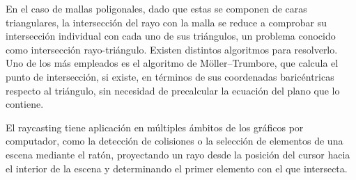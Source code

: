 En el caso de mallas poligonales, dado que estas se componen de caras triangulares, la intersección del rayo con la malla se reduce a comprobar su intersección individual con cada uno de sus triángulos, un problema conocido como intersección rayo-triángulo. Existen distintos algoritmos para resolverlo. Uno de los más empleados es el algoritmo de Möller–Trumbore, que calcula el punto de intersección, si existe, en términos de sus coordenadas baricéntricas respecto al triángulo, sin necesidad de precalcular la ecuación del plano que lo contiene.

El raycasting tiene aplicación en múltiples ámbitos de los gráficos por computador, como la detección de colisiones o la selección de elementos de una escena mediante el ratón, proyectando un rayo desde la posición del cursor hacia el interior de la escena y determinando el primer elemento con el que intersecta.
